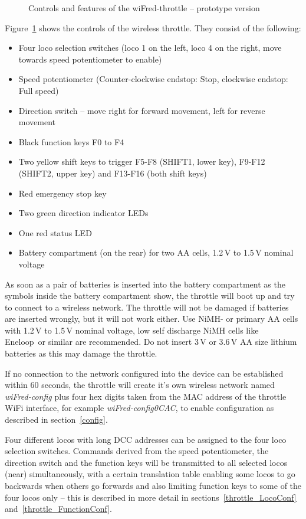 \documentclass[11pt,a4paper]{scrartcl}
\begin{document}
\begin{figure}[tbh]
  \caption{Controls and features of the wiFred-throttle -- prototype version}
  \label{oldThrottleControls}

\end{figure}

Figure~\ref{oldThrottleControls} shows the controls of the wireless throttle. They consist of the following:

\begin{itemize}
\item Four loco selection switches (loco 1 on the left, loco 4 on the right, move towards speed potentiometer to enable)
\item Speed potentiometer (Counter-clockwise endstop: Stop, clockwise endstop: Full speed)
\item Direction switch -- move right for forward movement, left for reverse movement
\item Black function keys F0 to F4
\item Two yellow shift keys to trigger F5-F8 (SHIFT1, lower key), F9-F12 (SHIFT2, upper key) and F13-F16 (both shift keys)
\item Red emergency stop key
\item Two green direction indicator LEDs
\item One red status LED
\item Battery compartment (on the rear) for two AA cells, 1.2\,V to 1.5\,V nominal voltage
\end{itemize}

As soon as a pair of batteries is inserted into the battery compartment as the symbols inside the battery compartment show, the throttle will boot up and try to connect to a wireless network. The throttle will not be damaged if batteries are inserted wrongly, but it will not work either. Use NiMH- or primary AA cells with 1.2\,V to 1.5\,V nominal voltage, low self discharge NiMH cells like Eneloop\textregistered\ or similar are recommended. Do not insert 3\,V or 3.6\,V AA size lithium batteries as this may damage the throttle.

If no connection to the network configured into the device can be established within 60 seconds, the throttle will create it's own wireless network named \textit{wiFred-config} plus four hex digits taken from the MAC address of the throttle WiFi interface, for example \textit{wiFred-config0CAC}, to enable configuration as described in section~\ref{config}.

Four different locos with long DCC addresses can be assigned to the four loco selection switches. Commands derived from the speed potentiometer, the direction switch and the function keys will be transmitted to all selected locos (near) simultaneously, with a certain translation table enabling some locos to go backwards when others go forwards and also limiting function keys to some of the four locos only -- this is described in more detail in sections~\ref{throttle_LocoConf} and~\ref{throttle_FunctionConf}.
\end{document}
